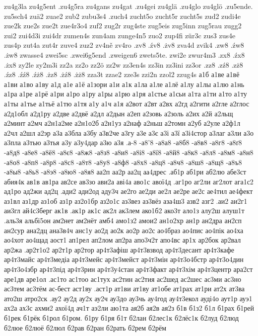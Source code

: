{{zu4g3la
zu4g5ent
.zu4g5ra
zu4gans
zu4gat
.zu4gei
zu4glä
.zu4glo
zu4glö
.zu5ende.
zu5sch4
zuä2
zuae2
zub2
zubu3s4
.zuch4
zucht5o
zucht5r
zucht5s
zud2
zudi4e
zue2k
zue2s
zue2t
zue4r3o4
zuf2
zug2r
zug4ste
zug5eis
zug5inn
zug5rau
zugg2
zui2
zui4d3i
zui4dr
zumen4s
zun4am
zunge4n5
zuo2
zup4fi
zür3c
zus3
zus4e
zus4p
zut4a
zut4r
zuve4
zuz2
zv4ně
zv4ro
.zv8
.źv8
.żv8
zva4d
zvik4
.zw8
.źw8
.żw8
zwasse4
zwei5sc
.zwei6g5end
.zweigen6
zwets5te.
zwi2e
zwur4m3
.zx8
.źx8
.żx8
zy2le
zy2m3i
zz2a
zz2o
zz2ö
zz2w
zz3en4s
zz3in
zz3ini
zz3or
.zz8
.zź8
.zż8
.źz8
.źź8
.źż8
.żz8
.żź8
.żż8
zza3t
zzae2
zze3s
zzi2n
zzol2
zzug4s
а1б
а1ве
а1вё
а1ви
а1во
а1ву
а1д
а1е
а1ё
а1зори
а1и
а1к
а1ла
а1ле
а1лё
а1лу
а1лы
а1лю
а1нь
а1ра
а1ре
а1рё
а1ри
а1ро
а1ру
а1ры
а1рю
а1ря
а1стье
а1сьи
а1та
а1ти
а1то
а1ту
а1ты
а1тье
а1тьё
а1тю
а1тя
а1у
а1ч
а1я
а2вот
а2вт
а2вх
а2гд
а2гити
а2гле
а2глос
а2д1обл
а2д1ру
а2две
а2двё
а2дл
а2дын
а2еп
а2зовь
а2золь
а2их
а2й
а2льщ
а2минт
а2мч
а2н1а2ме
а2н1о2б
а2н1уз
а2наф
а2ньш
а2томн
а2уб
а2уле
а2ф1л
а2чл
а2шл
а2эр
а3а
а3бла
а3бу
а3в2че
а3гу
а3е
а3є
а3і
а3ї
а3і4стор
а3лаг
а3ли
а3о
а3пла
а3тью
а3тья
а3у
а3у4дар
а3ю
а3я
.а-8
-а8'8
-а8а8
-а8б8
-а8в8
-а8г8
-а8ґ8
-а8д8
-а8е8
-а8ё8
-а8є8
-а8ж8
-а8з8
-а8и8
-а8і8
-а8ї8
-а8й8
-а8к8
-а8л8
-а8м8
-а8н8
-а8о8
-а8п8
-а8р8
-а8с8
-а8т8
-а8у8
-а8ф8
-а8х8
-а8ц8
-а8ч8
-а8ш8
-а8щ8
-а8ъ8
-а8ы8
-а8ь8
-а8э8
-а8ю8
-а8я8
аа2п
аа2р
аа2ц
аа4дрес
.аб1р
аб1ри
аб2лю
абе3ст
абия4к
ав1в
ав1ра
ав2се
ав3зо
ави2а
аві4а
аво1с
авої4д
.аг1ро
аг2ли
аг2лот
ага1с2
ад1ро
ад2жи
ад2ц
.ади2
ади2од
аду3ч
ае2го
ае2ди
ае2л
ае2ре
ае2с
ае4тил
ае4фект
аз1вл
аз1др
аз1об
аз1р
аз2о1бр
аз2о1с
аз3вез
аз3вёз
аза4ш3
азв2
азг2
.аи2
аи2г1
аи3гл
ай4с3берг
ак1в
.ак1р
ак1с
ак2л
ак3лем
ако1б2
ако3т
ало1з
алу2ш
алуш1т
.аль3я
альбі5он
ам2нет
ам2нёт
амб4
амо1з2
амои2
ан1о2хр
ан1р
ан2дра
ан2сп
ан2сур
ана2дц
ана3в4ч
анс1у
ао2д
ао2к
ао2р
ао2с
ао4браз
ао4пис
ао4пік
ао4ха
ао4хот
ао4щад
аост1
ап1рел
ап2лом
ап2ра
апо3ч2т
апо4вс
ар1х
ар2бок
ар2вал
ар2жа
.ар2т1о2
ар2т1р
ар2тор
ар4т3афіш
ар4т3взвод
ар4т3десант
ар4т3кафе
ар4т3майс
ар4т3медіа
ар4т3мейс
ар4т3мейст
ар4т3мін
ар4т3о4бстр
ар4т3о4дин
ар4т3о4збр
ар4т3під
ар4т3рин
ар4т3у4стан
ар4т3факт
ар4т3хім
ар4т3центр
ара2ст
аре1дв
аре1ол
.ас1то
ас1тоо
ас1тух
ас2тин
ас2тия
ас2шед
ас2шес
ас3ми
ас3но
ас3тем
ас3тём
ас-бест
аст1ву
.аст1р
ат1ви
ат1ву
ат1обе
ат1рах
ат1ри
ат2х
ат3ва
ато2ш
атро2ск
.ау2
ау2д
ау2х
ау2ч
ау3до
ау3чь
ау4год
ау4т3екол
ауді4о
аут1р
ауэ1
ах2а
ах3с
ахми2
ахої4д
ач1т
аэ2ли
аю1та
ая2б
ая2в
ая2з
б1в
б1з2
б1л
б1рах
б1рей
б1рек
б1рёк
б1рол
б1ром.
б1ру
б1ря
б1т
б2лан
б2лес1к
б2лёс1к
б2луд
б2люд
б2люе
б2люё
б2люл
б2рав
б2ран
б2рать
б2рем
б2рём
}}
